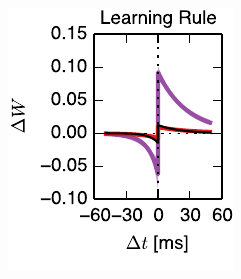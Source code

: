 \begin{figure}[t!]
\begin{subfigure}[T]{2.4in}
    \label{fig:fig3_add_nothr_trajectory}
  \end{subfigure}
  \begin{subfigure}[T]{1.45in}
    \includegraphics[width=\textwidth]{figures/ch6/fig3_add_nothr_stdp_rule}    
    \label{fig:fig3_add_nothr_stdp_rule}
  \end{subfigure}
  \begin{subfigure}[T]{1.45in}
    \hspace{.1in}

\end{subfigure}
\end{figure}
